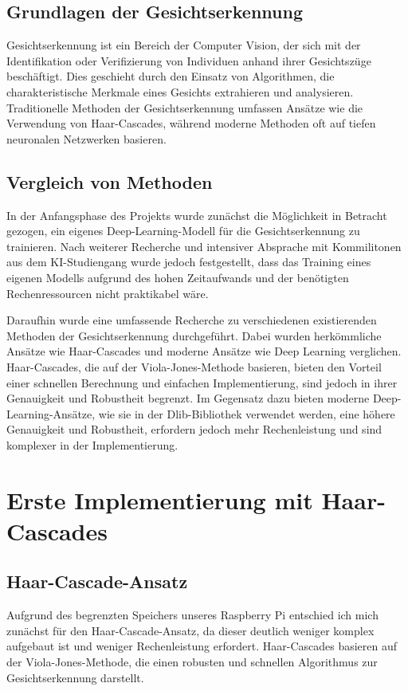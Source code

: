 \subsection{Grundlagen der Gesichtserkennung}
Gesichtserkennung ist ein Bereich der Computer Vision, der sich mit der Identifikation oder Verifizierung von Individuen anhand ihrer Gesichtszüge beschäftigt. Dies geschieht durch den Einsatz von Algorithmen, die charakteristische Merkmale eines Gesichts extrahieren und analysieren. Traditionelle Methoden der Gesichtserkennung umfassen Ansätze wie die Verwendung von Haar-Cascades, während moderne Methoden oft auf tiefen neuronalen Netzwerken basieren.

\subsection{Vergleich von Methoden}
In der Anfangsphase des Projekts wurde zunächst die Möglichkeit in Betracht gezogen, ein eigenes Deep-Learning-Modell für die Gesichtserkennung zu trainieren. Nach weiterer Recherche und intensiver Absprache mit Kommilitonen aus dem KI-Studiengang wurde jedoch festgestellt, dass das Training eines eigenen Modells aufgrund des hohen Zeitaufwands und der benötigten Rechenressourcen nicht praktikabel wäre.

Daraufhin wurde eine umfassende Recherche zu verschiedenen existierenden Methoden der Gesichtserkennung durchgeführt. Dabei wurden herkömmliche Ansätze wie Haar-Cascades und moderne Ansätze wie Deep Learning verglichen. Haar-Cascades, die auf der Viola-Jones-Methode basieren, bieten den Vorteil einer schnellen Berechnung und einfachen Implementierung, sind jedoch in ihrer Genauigkeit und Robustheit begrenzt. Im Gegensatz dazu bieten moderne Deep-Learning-Ansätze, wie sie in der Dlib-Bibliothek verwendet werden, eine höhere Genauigkeit und Robustheit, erfordern jedoch mehr Rechenleistung und sind komplexer in der Implementierung.



\section{Erste Implementierung mit Haar-Cascades}

\subsection{Haar-Cascade-Ansatz}
Aufgrund des begrenzten Speichers unseres Raspberry Pi entschied ich mich zunächst für den Haar-Cascade-Ansatz, da dieser deutlich weniger komplex aufgebaut ist und weniger Rechenleistung erfordert. Haar-Cascades basieren auf der Viola-Jones-Methode, die einen robusten und schnellen Algorithmus zur Gesichtserkennung darstellt. 


